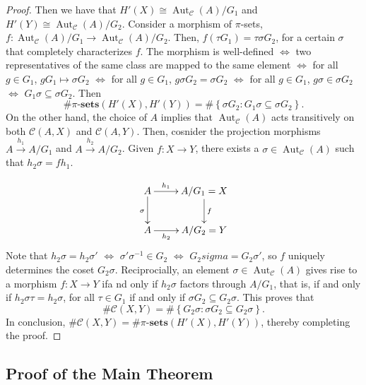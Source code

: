 \documentclass[10pt]{article}
\theoremstyle{thmstyle}
\theoremstyle{defstyle}
\newcommand{\sets}[1]{#1\text{-}\mathbf{sets}}
\newcommand{\Aut}{\operatorname{Aut}}
\newcommand{\scrC}{\mathscr{C}} %
\begin{document}
\begin{proof}
    Then we have that $H'(X)\cong\Aut_{\scrC}(A)/G_1$ and $H'(Y)\cong\Aut_{\scrC}(A)/G_2$. Consider a morphism of $\pi$-sets, $f: \Aut_{\scrC}(A)/G_1\to\Aut_{\scrC}(A)/G_2$. Then, $f(\tau G_1) = \tau\sigma G_2$, for a certain $\sigma$ that completely characterizes $f$. The morphism is well-defined $\iff$ two representatives of the same class are mapped to the same element $\iff$ for all $g\in G_1$, $gG_1\mapsto\sigma G_2$ $\iff$ for all $g\in G_1$, $g\sigma G_2 = \sigma G_2$ $\iff$ for all $g\in G_1$, $g\sigma\in\sigma G_2$ $\iff$ $G_1\sigma\subseteq\sigma G_2$. Then 
    \begin{equation*}
        \#\sets{\pi}\left(H'(X), H'(Y)\right) = \#\left\{\sigma G_2\colon G_1\sigma\subseteq\sigma G_2\right\}.
    \end{equation*}
    On the other hand, the choice of $A$ implies that $\Aut_{\scrC}(A)$ acts transitively on both $\scrC(A, X)$ and $\scrC(A, Y)$. Then, cosnider the projection morphisms $A\xrightarrow{h_1} A/G_1$ and $A\xrightarrow{h_2} A/G_2$. Given $f: X\to Y$, there exists a $\sigma\in\Aut_{\scrC}(A)$ such that $h_2\sigma = fh_1$. 

    \begin{equation*}
        \xymatrix {
            A\ar[r]^-{h_1}\ar[d]_{\sigma} & A/G_1 = X\ar[d]^f\\
            A\ar[r]_-{h_2} & A/G_2 = Y
        }
    \end{equation*}
    Note that $h_2\sigma = h_2\sigma'$ $\iff$ $\sigma'\sigma^{-1}\in G_2$ $\iff$ $G_2sigma = G_2\sigma'$, so $f$ uniquely determines the coset $G_2\sigma$. Reciprocially, an element $\sigma\in\Aut_{\scrC}(A)$ gives rise to a morphism $f: X\to Y$ ifa nd only if $h_2\sigma$ factors through $A/G_1$, that is, if and only if $h_2\sigma\tau = h_2\sigma$, for all $\tau\in G_1$ if and only if $\sigma G_2\subseteq G_2\sigma$. This proves that 
    \begin{equation*}
        \#\scrC(X, Y) = \#\left\{G_2\sigma\colon \sigma G_2\subseteq G_2\sigma\right\}.
    \end{equation*}
    In conclusion, $\#\scrC(X, Y) = \#\sets{\pi}(H'(X), H'(Y))$, thereby completing the proof.
\end{proof}

\subsection{Proof of the Main Theorem}
\end{document}
